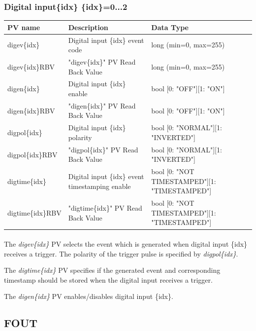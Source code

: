 \documentclass[openany]{article}
\begin{document}
		\subsubsection{Digital input\{idx\} \{idx\}=0...2}\label{pvgroup:evre-digital-input}
			\begin{center}
			\begin{tabular}{| m{2.8cm} m{6cm} m{6cm} |}
			    \hline
			    \bfseries PV name & \bfseries Description & \bfseries Data Type \\ \hline
			    digev\{idx\} & Digital input \{idx\} event code & long (min=0, max=255) \\ \hline
			    digev\{idx\}RBV & "digev\{idx\}" PV Read Back Value & long (min=0, max=255) \\ \hline
			    digen\{idx\} & Digital input \{idx\} enable & bool [0: "OFF"][1: "ON"] \\ \hline
			    digen\{idx\}RBV & "digen\{idx\}" PV Read Back Value & bool [0: "OFF"][1: "ON"] \\ \hline
			    digpol\{idx\} & Digital input \{idx\} polarity & bool [0: "NORMAL"][1: "INVERTED"] \\ \hline
			    digpol\{idx\}RBV & "digpol\{idx\}" PV Read Back Value & bool [0: "NORMAL"][1: "INVERTED"] \\ \hline
			    digtime\{idx\} & Digital input \{idx\} event timestamping enable & bool [0: "NOT TIMESTAMPED"][1: "TIMESTAMPED"] \\ \hline
			    digtime\{idx\}RBV & "digtime\{idx\}" PV Read Back Value & bool [0: "NOT TIMESTAMPED"][1: "TIMESTAMPED"] \\ \hline
			\end{tabular}
			\end{center}

			\paragraph{} The \emph{digev\{idx\}} PV selects the event which is generated when digital input \{idx\} receives a trigger. The polarity of the trigger pulse is specified by \emph{digpol\{idx\}}.
			\par The \emph{digtime\{idx\}} PV specifies if the generated event and corresponding timestamp should be stored when the digital input receives a trigger.
			\par The \emph{digen\{idx\}} PV enables/disables digital input \{idx\}.

	\subsection{FOUT}
\end{document}
